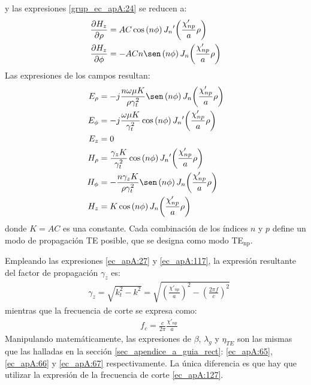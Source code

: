 y las expresiones \eqref{grup_ec_apA:24} se reducen a:
\begin{subequations}
\label{grup_ec_apA:25}
\begin{align}
\frac{\partial H_z}{\partial\rho} &= AC\cos\left(n\phi\right){J_n}'\!\left(\frac{\chi '_{np}}{a}\rho\right)
\label{ec_apA:118}\\
\frac{\partial H_z}{\partial\phi} &= - ACn\sen\left(n\phi\right)J_n\!\left(\frac{\chi '_{np}}{a}\rho\right)
\label{ec_apA:119}
\end{align}
\end{subequations}
Las expresiones de los campos resultan:
\begin{subequations}
\label{grup_ec_apA:26}
\begin{align}
E_{\rho} &= -j\frac{n\omega\mu K}{\rho\gamma_t^2}\sen\left(n\phi\right)J_n\!\left(\frac{\chi '_{np}}{a}\rho\right)
\label{ec_apA:120}\\
E_{\phi} &= -j\frac{\omega\mu K}{\gamma_t^2}\cos\left(n\phi\right){J_n}'\!\left(\frac{\chi '_{np}}{a}\rho\right)
\label{ec_apA:121}\\
E_z &= 0
\label{ec_apA:122}\\
H_{\rho} &= \frac{\gamma_zK}{\gamma_t^2}\cos\left(n\phi\right){J_n}'\!\left(\frac{\chi '_{np}}{a}\rho\right)
\label{ec_apA:123}\\
H_{\phi} &= -\frac{n\gamma_zK}{\rho\gamma_t^2}\sen\left(n\phi\right)J_n\!\left(\frac{\chi '_{np}}{a}\rho\right)
\label{ec_apA:124}\\
H_z &= K\cos\left(n\phi\right)J_n\!\left(\frac{\chi '_{np}}{a}\rho\right)
\label{ec_apA:125}
\end{align}
\end{subequations}
donde $K = AC$ es una constante. Cada combinación de los índices $n$ y $p$ define un modo de propagación TE posible, que se designa como modo TE$_{\text{np}}$.

Empleando las expresiones \eqref{ec_apA:27} y \eqref{ec_apA:117}, la expresión resultante del factor de propagación $\gamma_z$ es:
\begin{align}
&\gamma_z = \sqrt{k^2_t - k^2} = \sqrt{\left(\frac{\chi '_{np}}{a}\right)^2 - \left(\frac{2\pi f}{c}\right)^2}
\label{ec_apA:126}
\end{align}
mientras que la frecuencia de corte se expresa como:
\begin{align}
&f_c = \frac{c}{2\pi}\frac{\chi '_{np}}{a}
\label{ec_apA:127}
\end{align}
Manipulando matemáticamente, las expresiones de $\beta$, $\lambda_g$ y $\eta_{TE}$ son las mismas que las halladas en la sección \ref{sec_apendice_a_guia_rect}: \eqref{ec_apA:65}, \eqref{ec_apA:66} y \eqref{ec_apA:67} respectivamente. La única diferencia es que hay que utilizar la expresión de la frecuencia de corte \eqref{ec_apA:127}.

